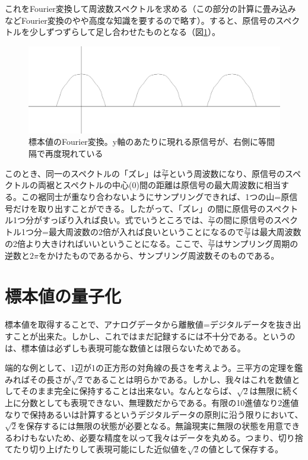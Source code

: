 これをFourier変換して周波数スペクトルを求める（この部分の計算に畳み込みなどFourier変換のやや高度な知識を要するので略す）。すると、原信号のスペクトルを少しずつずらして足し合わせたものとなる（図\ref{fig2_4}）。
\begin{figure}[htbp]
\centering
\includegraphics[width=0.8\linewidth,keepaspectratio]{fig/fig2_4.eps}
\caption{標本値のFourier変換。y軸のあたりに現れる原信号が、右側に等間隔で再度現れている}\label{fig2_4}
\end{figure}

このとき、同一のスペクトルの「ズレ」は$\frac{2\pi}{T}$という周波数になり、原信号のスペクトルの両裾とスペクトルの中心(0)間の距離は原信号の最大周波数に相当する。この裾同士が重なり合わないようにサンプリングできれば、1つの山=原信号だけを取り出すことができる。したがって、「ズレ」の間に原信号のスペクトル1つ分がすっぽり入れば良い。式でいうところでは、$\frac{2\pi}{T}$の間に原信号のスペクトル1つ分=最大周波数の2倍が入れば良いということになるので$\frac{2\pi}{T}$は最大周波数の2倍より大きければいいということになる。ここで、$\frac{2\pi}{T}$はサンプリング周期の逆数と$2\pi$をかけたものであるから、サンプリング周波数そのものである。

\section{標本値の量子化}
標本値を取得することで、アナログデータから離散値=デジタルデータを抜き出すことが出来た。しかし、これではまだ記録するには不十分である。というのは、標本値は必ずしも表現可能な数値とは限らないためである。

端的な例として、1辺が1の正方形の対角線の長さを考えよう。三平方の定理を鑑みればその長さが$\sqrt{2}$であることは明らかである。しかし、我々はこれを数値としてそのまま完全に保持することは出来ない。なんとならば、$\sqrt{2}$は無限に続く上に分数としても表現できない、無理数だからである。有限の10進値なり2進値なりで保持あるいは計算するというデジタルデータの原則に沿う限りにおいて、$\sqrt{2}$を保存するには無限の状態が必要となる。無論現実に無限の状態を用意できるわけもないため、必要な精度を以って我々はデータを丸める。つまり、切り捨てたり切り上げたりして表現可能にした近似値を$\sqrt{2}$の値として保存する。


